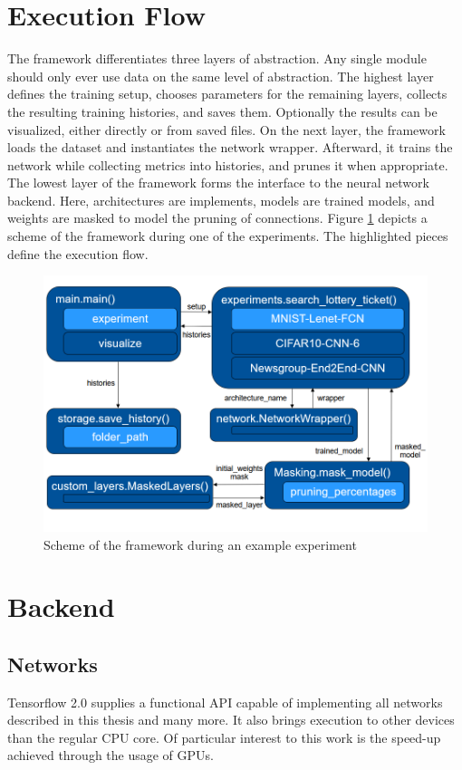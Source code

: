 \section{Execution Flow}
The framework differentiates three layers of abstraction. Any single module should only ever use data on the same level of abstraction.
The highest layer defines the training setup, chooses parameters for the remaining layers, collects the resulting training histories, and saves them. Optionally the results can be visualized, either directly or from saved files. 
On the next layer, the framework loads the dataset and instantiates the network wrapper. Afterward, it trains the network while collecting metrics into histories, and prunes it when appropriate.
The lowest layer of the framework forms the interface to the neural network backend. Here, architectures are implements, models are trained models, and weights are masked to model the pruning of connections.
Figure \ref{fig:Example Control Flow} depicts a scheme of the framework during one of the experiments. The highlighted pieces define the execution flow.
\begin{figure}
	\centering
	\includegraphics[width=450px]{gfx/chp_5_control_flow.png}
	\caption{Scheme of the framework during an example experiment}
	\label{fig:Example Control Flow}
\end{figure}

\section{Backend}
\subsection{Networks}
Tensorflow 2.0 supplies a functional API capable of implementing all networks described in this thesis and many more. It also brings execution to other devices than the regular CPU core.\cite{Tensorflow} Of particular interest to this work is the speed-up achieved through the usage of GPUs. 

